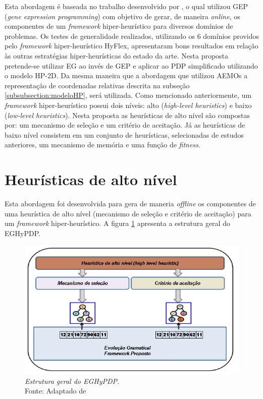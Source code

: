 Esta abordagem é baseada no trabalho desenvolvido por \cite{sabar2015automatic}, o qual  utilizou GEP (\textit{gene expression programming}) com objetivo de gerar, de maneira \textit{online}, os componentes de um \textit{framework} hiper-heurístico para diversos domínios de problemas. Os testes de generalidade realizados, utilizando os 6 domínios providos pelo \textit{framework} hiper-heurístico HyFlex, apresentaram bons resultados em relação às outras estratégias hiper-heurísticas do estado da arte. Nesta proposta pretende-se utilizar EG ao invés de GEP e aplicar ao PDP simplificado utilizando o modelo HP-2D. Da mesma maneira que a abordagem que utilizou  AEMOs a representação de coordenadas relativas descrita na subseção \ref{subsubsection:modeloHP}, será utilizada. Como mencionado anteriormente, um \textit{framework} hiper-heurístico possui dois níveis: alto (\textit{high-level heuristics}) e baixo (\textit{low-level heuristics}). Nesta proposta as heurísticas de alto nível são compostas por: um mecanismo de seleção e um critério de aceitação. Já as heurísticas de baixo nível consistem em um conjunto de heurísticas, selecionadas de estudos anteriores, um mecanismo de memória e uma função de \textit{fitness}. 

\section{Heurísticas de alto nível}
\label{sec:highlevelheuristics}
Esta abordagem  foi desenvolvida para gera de maneria \textit{offline} os componentes de uma heurística de alto nível (mecanismo de seleção e critério de aceitação) para um \textit{framework} hiper-heurístico. A figura \ref{fig:proposedFramework} apresenta a estrutura geral do EGHyPDP. 

\begin{figure}[!htb]
	\centering
	\includegraphics[scale=.98]{Imagens/proposedFramework.png}
	\caption{ \textit{Estrutura geral do EGHyPDP.} \\ Fonte: Adaptado de \cite{sabar2015automatic}}
	\label{fig:proposedFramework}
\end{figure}


